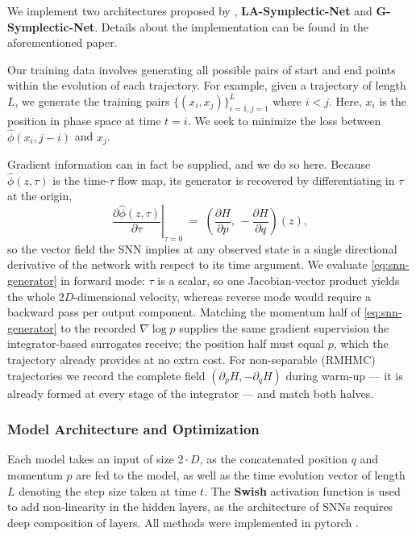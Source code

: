 \documentclass{article}
\newcommand{\dd}[2]{\frac{\partial #1}{\partial #2}}
\theoremstyle{plain}
\theoremstyle{definition}
\theoremstyle{remark}
\begin{document}
We implement two architectures proposed by \cite{jin2020sympnets}, \textbf{LA-Symplectic-Net} and \textbf{G-Symplectic-Net}. Details about the implementation can be found in the aforementioned paper. 

Our training data involves generating all possible pairs of start and end points within the evolution of each trajectory. For example, given a trajectory of length $L$, we generate the training pairs $\{(x_i, x_j)\}_{i=1, j=1}^{L}$ where $i < j$. Here, $x_i$ is the position in phase space at time $t = i$. We seek to minimize the loss between $\hat{\phi}(x_i,j - i)$ and $x_j$.

Gradient information can in fact be supplied, and we do so here. Because
$\hat\phi(z,\tau)$ is the time-$\tau$ flow map, its generator is recovered by
differentiating in $\tau$ at the origin,
\begin{equation}
    \left. \dd{\hat\phi(z,\tau)}{\tau} \right|_{\tau = 0}
    \;=\; \left( \dd{H}{p},\, -\dd{H}{q} \right)(z),
    \label{eq:snn-generator}
\end{equation}
so the vector field the SNN implies at any observed state is a single
directional derivative of the network with respect to its time argument. We
evaluate \eqref{eq:snn-generator} in forward mode: $\tau$ is a scalar, so one
Jacobian-vector product yields the whole $2D$-dimensional velocity, whereas
reverse mode would require a backward pass per output component. Matching the
momentum half of \eqref{eq:snn-generator} to the recorded $\nabla \log p$
supplies the same gradient supervision the integrator-based surrogates
receive; the position half must equal $p$, which the trajectory already
provides at no extra cost. For non-separable (RMHMC) trajectories we record
the complete field $(\partial_p H, -\partial_q H)$ during warm-up --- it is
already formed at every stage of the integrator --- and match both halves.



\subsubsection{Model Architecture and Optimization}
\label{sec:snn-training}
Each model takes an input of size $2 \cdot D$, as the concatenated position $q$
and momentum $p$ are fed to the model, as well as the time evolution vector of
length $L$ denoting the step size taken at time $t$. The \textbf{Swish}
\cite{ramachandran2017searching} activation function is used to add
non-linearity in the hidden layers, as the architecture of SNNs requires deep
composition of layers. All methods were implemented in pytorch
\cite{paszke2019pytorch}.
\end{document}
